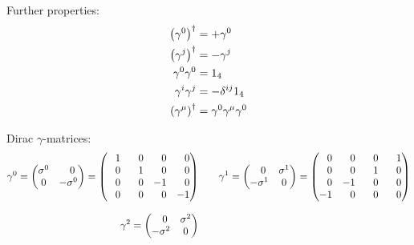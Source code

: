 			\noindent
			Further properties:
			\begin{equation}
				\begin{aligned}
					\Br{\gamma^0}^\dagger &= +\gamma^0 \\
					\Br{\gamma^j}^\dagger &= -\gamma^j \\
					\gamma^0 \gamma^0 &= 1_4 \\ %
					\gamma^i \gamma^j &= - \delta^{ij} 1_4 \\
					\Br{\gamma^\mu}^\dagger &= \gamma^0 \gamma^\mu \gamma^0 \\
				\end{aligned}
			\end{equation}

			\noindent
			Dirac $\gamma$-matrices:
			\begin{equation}
				\begin{aligned}
					\gamma^0
					= \left( \begin{matrix}
					\sigma^0 & \M0 \\
					0 &  -\sigma^0
					\end{matrix} \right)
					= \left( \begin{matrix}
					\M 1 & \M 0 & \M 0 & \M 0 \\
					\M 0 & \M 1 & \M 0 & \M 0 \\
					\M 0 & \M 0 &   -1 & \M 0 \\
					\M 0 & \M 0 & \M 0 &   -1 \\
					\end{matrix} \right)
					&\hspace{20pt}
					\gamma^1
					= \left( \begin{matrix}
					\M0 & \sigma^1 \\
					-\sigma^1 &  0
					\end{matrix} \right)
					= \left( \begin{matrix}
					\M 0 & \M 0 & \M 0 & \M 1 \\
					\M 0 & \M 0 & \M 1 & \M 0 \\
					\M 0 &   -1 & \M 0 & \M 0 \\
					-1 & \M 0 & \M 0 & \M 0 \\
					\end{matrix} \right) \\[8pt]
					\gamma^2
					= \left( \begin{matrix}
					\M0 & \sigma^2 \\
					-\sigma^2 &  0
					\end{matrix} \right)

\end{aligned}
\end{equation}
